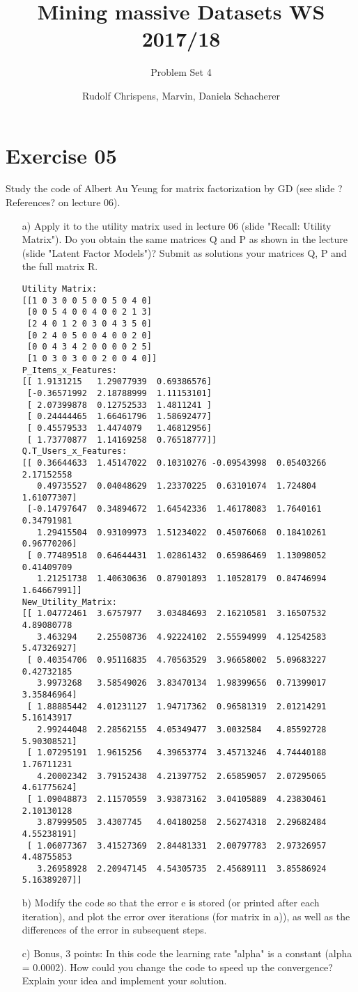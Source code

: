 \documentclass[11pt,a4paper]{scrartcl}
\title{Mining massive Datasets WS 2017/18}
\subtitle{Problem Set 4}
\author{Rudolf Chrispens, Marvin, Daniela Schacherer}
\begin{document}
\maketitle

\section*{Exercise 05}
Study the code of Albert Au Yeung for matrix factorization by GD (see slide ?References? on lecture 06).

\begin{itemize}
	\item [a)] Apply it to the utility matrix used in lecture 06 (slide "Recall: Utility Matrix"). Do you obtain the same matrices Q and P as shown in the lecture (slide "Latent Factor Models")? Submit as solutions your matrices Q, P and the full matrix R.
\begin{verbatim}	
Utility Matrix:
[[1 0 3 0 0 5 0 0 5 0 4 0]
 [0 0 5 4 0 0 4 0 0 2 1 3]
 [2 4 0 1 2 0 3 0 4 3 5 0]
 [0 2 4 0 5 0 0 4 0 0 2 0]
 [0 0 4 3 4 2 0 0 0 0 2 5]
 [1 0 3 0 3 0 0 2 0 0 4 0]]
P_Items_x_Features:
[[ 1.9131215   1.29077939  0.69386576]
 [-0.36571992  2.18788999  1.11153101]
 [ 2.07399878  0.12752533  1.4811241 ]
 [ 0.24444465  1.66461796  1.58692477]
 [ 0.45579533  1.4474079   1.46812956]
 [ 1.73770877  1.14169258  0.76518777]]
Q.T_Users_x_Features:
[[ 0.36644633  1.45147022  0.10310276 -0.09543998  0.05403266  2.17152558
   0.49735527  0.04048629  1.23370225  0.63101074  1.724804    1.61077307]
 [-0.14797647  0.34894672  1.64542336  1.46178083  1.7640161   0.34791981
   1.29415504  0.93109973  1.51234022  0.45076068  0.18410261  0.96770206]
 [ 0.77489518  0.64644431  1.02861432  0.65986469  1.13098052  0.41409709
   1.21251738  1.40630636  0.87901893  1.10528179  0.84746994  1.64667991]]
New_Utility_Matrix:
[[ 1.04772461  3.6757977   3.03484693  2.16210581  3.16507532  4.89080778
   3.463294    2.25508736  4.92224102  2.55594999  4.12542583  5.47326927]
 [ 0.40354706  0.95116835  4.70563529  3.96658002  5.09683227  0.42732185
   3.9973268   3.58549026  3.83470134  1.98399656  0.71399017  3.35846964]
 [ 1.88885442  4.01231127  1.94717362  0.96581319  2.01214291  5.16143917
   2.99244048  2.28562155  4.05349477  3.0032584   4.85592728  5.90308521]
 [ 1.07295191  1.9615256   4.39653774  3.45713246  4.74440188  1.76711231
   4.20002342  3.79152438  4.21397752  2.65859057  2.07295065  4.61775624]
 [ 1.09048873  2.11570559  3.93873162  3.04105889  4.23830461  2.10130128
   3.87999505  3.4307745   4.04180258  2.56274318  2.29682484  4.55238191]
 [ 1.06077367  3.41527369  2.84481331  2.00797783  2.97326957  4.48755853
   3.26958928  2.20947145  4.54305735  2.45689111  3.85586924  5.16389207]]
\end{verbatim}	
	\item [b)] Modify the code so that the error e is stored (or printed after each iteration), and plot the error over iterations (for matrix in a)), as well as the differences of the error in subsequent steps.
	\item [c)] Bonus, 3 points: In this code the learning rate "alpha" is a constant (alpha = 0.0002). How could you change the code to speed up the convergence? Explain your idea and implement your solution.
\end{itemize}
	
\end{document}
